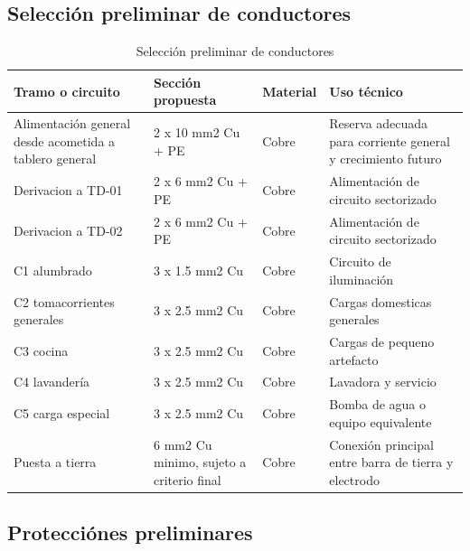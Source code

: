 \subsection{Selección preliminar de conductores}

\begin{table}[H]
\centering
\small
\caption{Selección preliminar de conductores}
\label{tab:seleccion-conductores}
\begin{tabularx}{\textwidth}{L{3.5cm}L{3.0cm}L{2.2cm}Y}
\toprule
\textbf{Tramo o circuito} & \textbf{Sección propuesta} & \textbf{Material} & \textbf{Uso técnico} \\
\midrule
Alimentación general desde acometida a tablero general & 2 x 10 mm2 Cu + PE & Cobre & Reserva adecuada para corriente general y crecimiento futuro \\
Derivacion a TD-01 & 2 x 6 mm2 Cu + PE & Cobre & Alimentación de circuito sectorizado \\
Derivacion a TD-02 & 2 x 6 mm2 Cu + PE & Cobre & Alimentación de circuito sectorizado \\
C1 alumbrado & 3 x 1.5 mm2 Cu & Cobre & Circuito de iluminación \\
C2 tomacorrientes generales & 3 x 2.5 mm2 Cu & Cobre & Cargas domesticas generales \\
C3 cocina & 3 x 2.5 mm2 Cu & Cobre & Cargas de pequeno artefacto \\
C4 lavandería & 3 x 2.5 mm2 Cu & Cobre & Lavadora y servicio \\
C5 carga especial & 3 x 2.5 mm2 Cu & Cobre & Bomba de agua o equipo equivalente \\
Puesta a tierra & 6 mm2 Cu minimo, sujeto a criterio final & Cobre & Conexión principal entre barra de tierra y electrodo \\
\bottomrule
\end{tabularx}
\end{table}

\subsection{Protecciónes preliminares}

